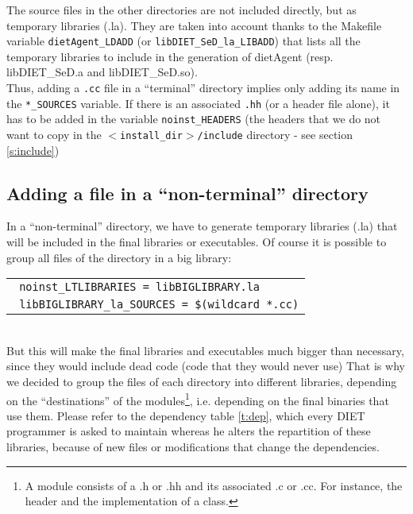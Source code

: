 The source files in the other directories are not included directly,
but as temporary libraries (\textsf{.la}). They are taken into account
thanks to the Makefile variable \texttt{dietAgent\_LDADD} (or
\texttt{libDIET\_SeD\_la\_LIBADD}) that lists all the temporary
libraries to include in the generation of \textsf{dietAgent}
(resp. \textsf{libDIET\_SeD.a} and \textsf{libDIET\_SeD.so}).\\

Thus, adding a \texttt{.cc} file in a ``terminal'' directory implies
only adding its name in the \texttt{*\_SOURCES} variable. If there is
an associated \texttt{.hh} (or a header file alone), it has to be
added in the variable \texttt{noinst\_HEADERS} (the headers that we do
not want to copy in the \texttt{$<$install\_dir$>$/include} directory
- see section \ref{s:include})


\subsection{Adding a file in a ``non-terminal'' directory}

In a ``non-terminal'' directory, we have to generate temporary
libraries (\textsf{.la}) that will be included in the final libraries
or executables. Of course it is possible to group all files of the
directory in a big library: \\
\begin{tabular}{l}
\tt
noinst\_LTLIBRARIES = libBIGLIBRARY.la\\
\tt
libBIGLIBRARY\_la\_SOURCES = \$(wildcard *.cc)\\
\end{tabular}
\\ But this will make the final libraries and executables much bigger
than necessary, since they would include dead code (code that they
would never use) That is why we decided to group the files of each
directory into different libraries, depending on the ``destinations''
of the modules\footnote{A module consists of a \textsf{.h} or
\textsf{.hh} and its associated \textsf{.c} or \textsf{.cc}. For
instance, the header and the implementation of a class.},
i.e. depending on the final binaries that use them. Please refer to
the dependency table \ref{t:dep}, which every DIET programmer is asked
to maintain whereas he alters the repartition of these libraries,
because of new files or modifications that change the dependencies.  \\

